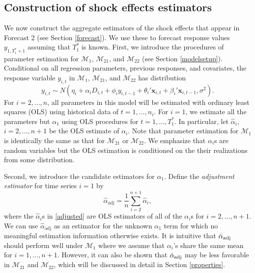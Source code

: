 \documentclass[11pt]{article}
\newcommand{\x}{\textbf{x}}
\def\mc#1{\mathcal{#1}} %
\def\E#1{\mathrm{E}(#1)} %
\theoremstyle{definition}
\begin{document}
\subsection{Construction of shock effects estimators}
\label{constructionofestimators}

We now construct the aggregate estimators of the shock effects that appear in 
Forecast 2 (see Section \ref{forecast}). We use these to forecast response values $y_{1, T_1^*+1}$ assuming that $T_1^*$ is known.  %
First, we introduce the procedures of parameter estimation for 
$\mc{M}_1$, $\mc{M}_{21}$, and $\mc{M}_{22}$ (see Section \ref{modelsetup}). 
Conditional on all regression parameters, previous responses, and covariates, 
the response variable $y_{i,t}$ in $\mc{M}_1$, $\mc{M}_{21}$, and $\mc{M}_{22}$ 
has distribution 
$$
  y_{i,t} 
    \sim N(\eta_i + \alpha_iD_{i,t} + \phi_i y_{i,t-1} + \theta_i'\x_{i,t} 
      + \beta_i'\x_{i,t-1}, \sigma^2).
$$
For $i = 2, \ldots, n$, all parameters in this model will be estimated with ordinary least squares 
(OLS) using historical data of $t = 1, \ldots, n_i$. For $i = 1$, we estimate all the parameters but $\alpha_1$ using OLS procedures for $t=1, \ldots, T_1^*$. In particular, let $\hat{\alpha}_i$, $i = 2, \ldots, n+1$ be the OLS estimate 
of $\alpha_i$.  Note that parameter estimation 
for $\mc{M}_1$ is identically the same as that for $\mc{M}_{21}$ or $\mc{M}_{22}$.  We emphasize that $\alpha_i$s are random variables but the OLS estimation is conditioned on the their realizations from some distribution.


Second, we introduce the candidate estimators for $\alpha_1$. Define the 
\emph{adjustment estimator} for time series $i=1$ by
\begin{equation} \label{adjusted}
  \hat{\alpha}_{\text{adj}} = \frac{1}{n}\sum_{i=2}^{n+1}\hat{\alpha}_i,
\end{equation}
where the $\hat{\alpha}_i$s in \eqref{adjusted} are OLS estimators of all of 
the $\alpha_i$s for $i = 2, \ldots, n+1$.  We can use $\hat{\alpha}_{\text{adj}}$ as an estimator for 
the unknown $\alpha_1$ term for which no meaningful estimation information 
otherwise exists. It is intuitive that $\hat{\alpha}_{\rm adj}$ should perform 
well under $\mc{M}_1$ where we assume that $\alpha_i$'s share the same mean 
for $i= 1, \ldots, n+1$. However, it can also be shown that 
$\hat{\alpha}_{\rm adj}$ may be less favorable in $\mc{M}_{21}$ 
and $\mc{M}_{22}$, which will be discussed in detail in Section \ref{properties}. 
\end{document}
